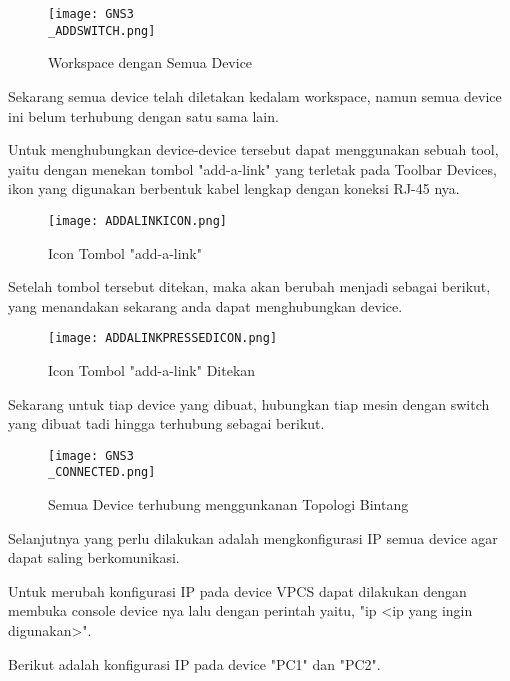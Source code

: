 \documentclass[12pt, a4paper]{article}
\begin{document}
      \begin{figure}[h]
          \centering
          \texttt{[image: GNS3\\\_ADDSWITCH.png]}
          \caption{\small{Workspace dengan Semua Device}}
      \end{figure}    

      \newpage

      Sekarang semua device telah diletakan kedalam workspace, namun semua device
      ini belum terhubung dengan satu sama lain.

      Untuk menghubungkan device-device tersebut dapat menggunakan sebuah tool,
      yaitu dengan menekan tombol "add-a-link" yang terletak pada Toolbar Devices,
      ikon yang digunakan berbentuk kabel lengkap dengan koneksi RJ-45 nya.

      \begin{figure}[h]
          \centering
          \texttt{[image: ADDALINKICON.png]}
          \caption{\small{Icon Tombol "add-a-link"}}
      \end{figure}    

      Setelah tombol tersebut ditekan, maka akan berubah menjadi sebagai berikut,
      yang menandakan sekarang anda dapat menghubungkan device.

      \begin{figure}[h]
          \centering
          \texttt{[image: ADDALINKPRESSEDICON.png]}
          \caption{\small{Icon Tombol "add-a-link" Ditekan}}
      \end{figure}    

      Sekarang untuk tiap device yang dibuat, hubungkan tiap mesin dengan 
      switch yang dibuat tadi hingga terhubung sebagai berikut.

      \begin{figure}[h]
          \centering
          \texttt{[image: GNS3\\\_CONNECTED.png]}
          \caption{\small{Semua Device terhubung menggunkanan Topologi Bintang}}
      \end{figure}    

      \newpage

      Selanjutnya yang perlu dilakukan adalah mengkonfigurasi IP semua device
      agar dapat saling berkomunikasi.

      Untuk merubah konfigurasi IP pada device VPCS dapat dilakukan dengan
      membuka console device nya lalu dengan perintah yaitu, 
      "ip <ip yang ingin digunakan>".

      Berikut adalah konfigurasi IP pada device "PC1" dan "PC2".
\end{document}
